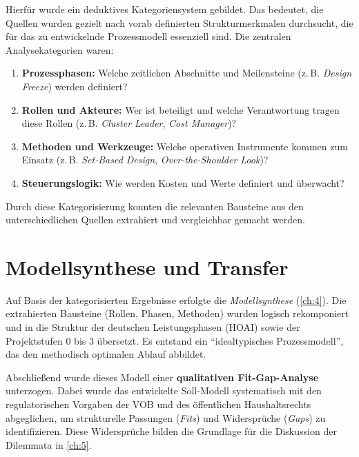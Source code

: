 Hierfür wurde ein deduktives Kategoriensystem gebildet.\autocite[Vgl.][S.~68]{mayring_qualitative_2022} Das bedeutet, die Quellen wurden gezielt nach vorab definierten Strukturmerkmalen durchsucht, die für das zu entwickelnde Prozessmodell essenziell sind. Die zentralen Analysekategorien waren:

\begin{enumerate}
    \item \textbf{Prozessphasen:} Welche zeitlichen Abschnitte und Meilensteine (z.\,B. \textit{Design Freeze}) werden definiert?
    \item \textbf{Rollen und Akteure:} Wer ist beteiligt und welche Verantwortung tragen diese Rollen (z.\,B. \textit{Cluster Leader}, \textit{Cost Manager})?
    \item \textbf{Methoden und Werkzeuge:} Welche operativen Instrumente kommen zum Einsatz (z.\,B. \textit{Set-Based Design}, \textit{Over-the-Shoulder Look})?
    \item \textbf{Steuerungslogik:} Wie werden Kosten und Werte definiert und überwacht?
\end{enumerate}

Durch diese Kategorisierung konnten die relevanten Bausteine aus den unterschiedlichen Quellen extrahiert und vergleichbar gemacht werden.

\section{Modellsynthese und Transfer}
\label{sec:3.4}

Auf Basis der kategorisierten Ergebnisse erfolgte die \textit{Modellsynthese} (\cref{ch:4}).
Die extrahierten Bausteine (Rollen, Phasen, Methoden) wurden logisch rekomponiert und in die Struktur der deutschen Leistungsphasen (\acs{HOAI}) sowie der Projektstufen 0 bis 3 übersetzt. Es entstand ein \enquote{idealtypisches Prozessmodell}, das den methodisch optimalen Ablauf abbildet.

Abschließend wurde dieses Modell einer \textbf{qualitativen Fit-Gap-Analyse} unterzogen. Dabei wurde das entwickelte Soll-Modell systematisch mit den regulatorischen Vorgaben der \acs{VOB} und des öffentlichen Haushaltsrechts abgeglichen, um strukturelle Passungen (\textit{Fits}) und Widersprüche (\textit{Gaps}) zu identifizieren. Diese Widersprüche bilden die Grundlage für die Diskussion der Dilemmata in \cref{ch:5}.





\FloatBarrier
